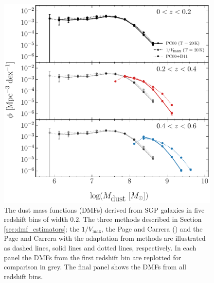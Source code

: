 \begin{figure}
    \centering
    \includegraphics[width=\columnwidth]{Figures/Figure_3_4_part1.pdf}
    \caption[Dust mass functions derived from SGP galaxies]{The dust mass functions (DMFs) derived from SGP galaxies in five redshift bins of width $0.2$. The three methods described in Section \ref{sec:dmf_estimators}; the $1/V_{\textrm{max}}$, the Page and Carrera (\citealt{Page_2000}) and the Page and Carrera with the adaptation from \citealt{Dunne_2011} methods are illustrated as dashed lines, solid lines and dotted lines, respectively. In each panel the DMFs from the first redshift bin are replotted for comparison in grey. The final panel shows the DMFs from all redshift bins.}
	\label{fig:dmf_methods}
\end{figure}

